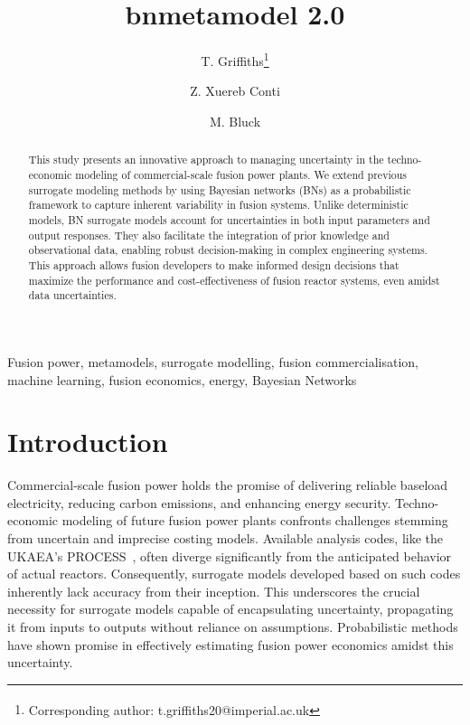 \documentclass[journal]{IEEEtran}
\begin{document}
\title{bnmetamodel 2.0}

\author[1]{T. Griffiths\thanks{\textsuperscript{\Cross}Corresponding author: t.griffiths20@imperial.ac.uk}}
\author[2]{Z. Xuereb Conti}
\author[1]{M. Bluck}

\vspace{-15pt}

\maketitle

\begin{abstract}
This study presents an innovative approach to managing uncertainty in the techno-economic modeling of commercial-scale fusion power plants. We extend previous surrogate modeling methods by using Bayesian networks (BNs) as a probabilistic framework to capture inherent variability in fusion systems. Unlike deterministic models, BN surrogate models account for uncertainties in both input parameters and output responses. They also facilitate the integration of prior knowledge and observational data, enabling robust decision-making in complex engineering systems. This approach allows fusion developers to make informed design decisions that maximize the performance and cost-effectiveness of fusion reactor systems, even amidst data uncertainties.
\end{abstract}

\begin{IEEEkeywords}
Fusion power, metamodels, surrogate modelling, fusion commercialisation, machine learning, fusion economics, energy, Bayesian Networks
\end{IEEEkeywords}
\vspace{-2ex}

\section{Introduction}

Commercial-scale fusion power holds the promise of delivering reliable baseload electricity, reducing carbon emissions, and enhancing energy security. Techno-economic modeling of future fusion power plants confronts challenges stemming from uncertain and imprecise costing models. Available analysis codes, like the UKAEA's PROCESS~\cite{Kovari2014,Kovari2016}, often diverge significantly from the anticipated behavior of actual reactors. Consequently, surrogate models developed based on such codes inherently lack accuracy from their inception. This underscores the crucial necessity for surrogate models capable of encapsulating uncertainty, propagating it from inputs to outputs without reliance on assumptions. Probabilistic methods have shown promise in effectively estimating fusion power economics amidst this uncertainty.
\end{document}

